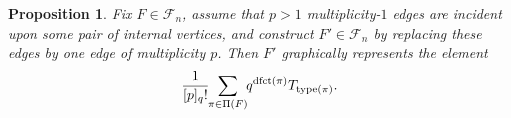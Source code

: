 \documentclass[12pt]{amsart}
\newtheorem{prop}[thm]{Proposition}
\theoremstyle{definition}
\numberwithin{equation}{section}
\newcommand{\sn}{\mathfrak{S}_n}
\newcommand{\dfct}{\mathrm{dfct}}
\newcommand{\ctr}[1]{{x}_{#1}}
\newcommand{\type}{\mathrm{type}}
\newcommand{\ntksp}{\negthickspace}
\newcommand{\ocnet}[1]{\mathcal F_{#1}}%
\begin{document}
\begin{prop}\label{p:qfact}
    Fix $F \in \ocnet n$, assume that %
$p > 1$
multiplicity-$1$ edges are incident upon some pair of internal vertices, and construct $F' \in \ocnet n$ by replacing these edges by one edge of multiplicity $p$.
Then $F'$ graphically represents the element
    \begin{equation*}
     \frac 1{[p]_q!} 
     \ntksp\sum_{\pi \in \Pi(F)}\ntksp q^{\dfct(\pi)}T_{\type(\pi)}.
     \end{equation*}
\end{prop}
\end{document}
